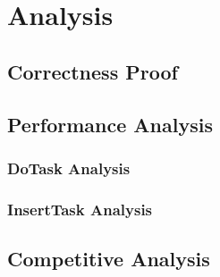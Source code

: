
\chapter{Analysis}

\section{Correctness Proof}

\section{Performance Analysis}
\subsection*{DoTask Analysis}
\subsection*{InsertTask Analysis}

\section{Competitive Analysis}
